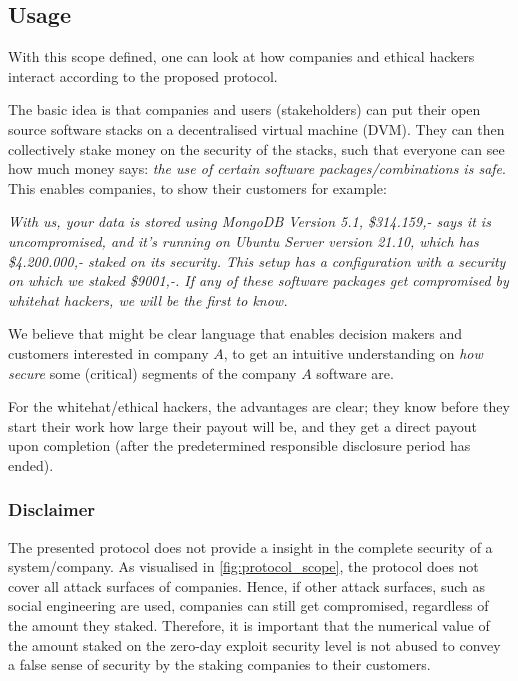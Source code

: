 \subsection{Usage}
\noindent With this scope defined, one can look at how companies and ethical hackers interact according to the proposed protocol.

The basic idea is that companies and users (stakeholders) can put their open source software stacks on a decentralised virtual machine (DVM). They can then collectively stake money on the security of the stacks, such that everyone can see how much money says: \textit{the use of certain software packages/combinations is safe}. This enables companies, to show their customers for example:

\textit{With us, your data is stored using MongoDB Version 5.1, \$314.159,- says it is uncompromised, and it's running on Ubuntu Server version 21.10, which has \$4.200.000,- staked on its security. This setup has a configuration with a security on which we staked \$9001,-. If any of these software packages get compromised by whitehat hackers, we will be the first to know.}

We believe that might be clear language that enables decision makers and customers interested in company $A$, to get an intuitive understanding on \textit{how secure} some (critical) segments of the company $A$ software are.

For the whitehat/ethical hackers, the advantages are clear; they know before they start their work how large their payout will be, and they get a direct payout upon completion (after the predetermined responsible disclosure period has ended).

\subsubsection{Disclaimer}
The presented protocol does not provide a insight in the complete security of a system/company. As visualised in \cref{fig:protocol_scope}, the protocol does not cover all attack surfaces of companies. Hence, if other attack surfaces, such as social engineering are used, companies can still get compromised, regardless of the amount they staked. Therefore, it is important that the numerical value of the amount staked on the zero-day exploit security level is not abused to convey a false sense of security by the staking companies to their customers.

